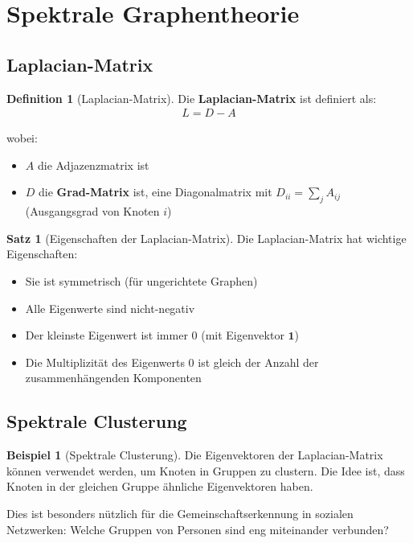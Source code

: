 ﻿\documentclass[a4paper,12pt]{report}
\theoremstyle{definition}
\newtheorem{definition}{Definition}
\newtheorem{beispiel}{Beispiel}
\newtheorem{satz}{Satz}
\begin{document}
	\section{Spektrale Graphentheorie}
	
	\subsection{Laplacian-Matrix}
	
	\begin{definition}[Laplacian-Matrix]
		Die \textbf{Laplacian-Matrix} ist definiert als:
		\begin{align}
			L = D - A
		\end{align}
		
		wobei:
		\begin{itemize}
			\item[-] $A$ die Adjazenzmatrix ist
			\item[-] $D$ die \textbf{Grad-Matrix} ist, eine Diagonalmatrix mit $D_{ii} = \sum_j A_{ij}$ (Ausgangsgrad von Knoten $i$)
		\end{itemize}
	\end{definition}
	
	\begin{satz}[Eigenschaften der Laplacian-Matrix]
		Die Laplacian-Matrix hat wichtige Eigenschaften:
		\begin{itemize}
			\item[-] Sie ist symmetrisch (für ungerichtete Graphen)
			\item[-] Alle Eigenwerte sind nicht-negativ
			\item[-] Der kleinste Eigenwert ist immer 0 (mit Eigenvektor $\mathbf{1}$)
			\item[-] Die Multiplizität des Eigenwerts 0 ist gleich der Anzahl der zusammenhängenden Komponenten
		\end{itemize}
	\end{satz}
	
	\subsection{Spektrale Clusterung}
	
	\begin{beispiel}[Spektrale Clusterung]
		Die Eigenvektoren der Laplacian-Matrix können verwendet werden, um Knoten in Gruppen zu clustern. Die Idee ist, dass Knoten in der gleichen Gruppe ähnliche Eigenvektoren haben.
		
		Dies ist besonders nützlich für die Gemeinschaftserkennung in sozialen Netzwerken: Welche Gruppen von Personen sind eng miteinander verbunden?
	\end{beispiel}
	
\end{document}
